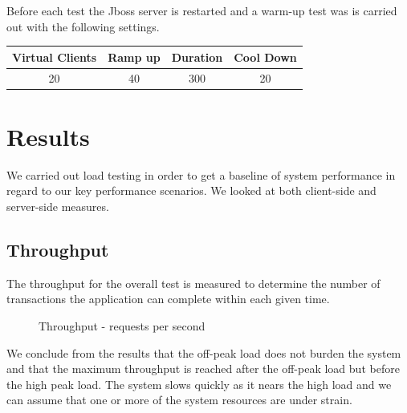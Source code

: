 Before each test the Jboss server is restarted and a warm-up test was is carried out with the following settings. 
\begin{center}
\begin{tabular}{| c | c | c | c |}
\hline
Virtual Clients & Ramp up & Duration & Cool Down \\
\hline
20 & 40 & 300 & 20 \\ 
\hline
\end{tabular}
\end{center}

\section{Results}
We carried out load testing in order to get a baseline of system performance in regard to our key performance scenarios. We looked at both client-side and server-side measures. 
\subsection*{Throughput} 
The throughput for the overall test is measured to determine the number of transactions the application can complete within each given time.

\begin{figure}[h]
\centering
{}
\caption{Throughput - requests per second}
\label{fig:4.2}
\end{figure}

We conclude from the results that the off-peak load does not burden the system and that the maximum throughput is reached after the off-peak load but before the high peak load. The system slows quickly as it nears the high load and we can assume that one or more of the system resources are under strain.

